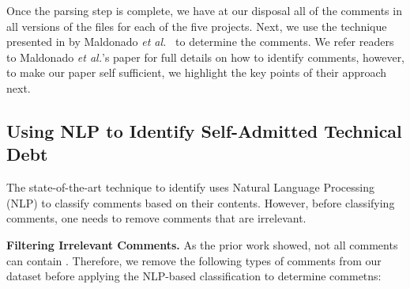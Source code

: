 Once the parsing step is complete, we have at our disposal all of the comments in all versions of the files for each of the five projects. Next, we use the technique presented in by Maldonado \emph{et al.}~\cite{Maldonado2015TSE} to determine the \SATD comments. We refer readers to Maldonado \emph{et al.}'s paper for full details on how to identify \SATD comments, however, to make our paper self sufficient, we highlight the key points of their approach next.

\subsection{Using NLP to Identify Self-Admitted Technical Debt}

The state-of-the-art technique to identify \SATD uses Natural Language Processing (NLP) to classify comments based on their contents. However, before classifying comments, one needs to remove comments that are irrelevant. 

\noindent\textbf{Filtering Irrelevant Comments.} As the prior work showed, not all comments can contain \SATD {}. Therefore, we remove the following types of comments from our dataset before applying the NLP-based classification to determine \SATD commetns:

